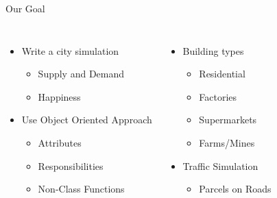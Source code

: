 
\begin{frame}[t,plain]
\titlepage
\end{frame}


\begin{frame}[fragile]{Our Goal}
%
\begin{columns}[T]
\begin{itemize}
\item Write a city simulation
	\begin{itemize}
	\item Supply and Demand
	\item Happiness
	\end{itemize}
\item Use Object Oriented Approach
	\begin{itemize}
	\item Attributes
	\item Responsibilities
	\item Non-Class Functions
	\end{itemize}
\end{itemize}
%
\begin{itemize}
\item Building types
	\begin{itemize}
	\item Residential
	\item Factories
	\item Supermarkets
	\item Farms/Mines
	\end{itemize}
\item Traffic Simulation
	\begin{itemize}
	\item Parcels on Roads
	\end{itemize}
\end{itemize}
\end{columns}
%
\end{frame}


